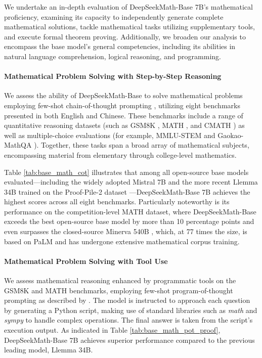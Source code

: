 \begin{itemize}[topsep=0pt]
\begin{itemize}[topsep=0pt]
We undertake an in-depth evaluation of DeepSeekMath-Base 7B’s mathematical proficiency, examining its capacity to independently generate complete mathematical solutions, tackle mathematical tasks utilizing supplementary tools, and execute formal theorem proving. Additionally, we broaden our analysis to encompass the base model's general competencies, including its abilities in natural language comprehension, logical reasoning, and programming.

\paragraph{Mathematical Problem Solving with Step-by-Step Reasoning}

We assess the ability of DeepSeekMath-Base to solve mathematical problems employing few-shot chain-of-thought prompting \citep{cot}, utilizing eight benchmarks presented in both English and Chinese. These benchmarks include a range of quantitative reasoning datasets (such as GSM8K \citep{gsm8k}, MATH \citep{MATH}, and CMATH \citep{wei2023cmath}) as well as multiple-choice evaluations (for example, MMLU-STEM \citep{mmlu} and Gaokao-MathQA \citep{agieval}). Together, these tasks span a broad array of mathematical subjects, encompassing material from elementary through college-level mathematics.

Table \ref{tab:base_math_cot} illustrates that among all open-source base models evaluated—including the widely adopted Mistral 7B \citep{mistral} and the more recent Llemma 34B \citep{llemma} trained on the Proof-Pile-2 dataset \citep{llemma}—DeepSeekMath-Base 7B achieves the highest scores across all eight benchmarks. Particularly noteworthy is its performance on the competition-level MATH dataset, where DeepSeekMath-Base exceeds the best open-source base model by more than 10 percentage points and even surpasses the closed-source Minerva 540B \citep{minerva}, which, at 77 times the size, is based on PaLM \citep{palm} and has undergone extensive mathematical corpus training.

\paragraph{Mathematical Problem Solving with Tool Use} We assess mathematical reasoning enhanced by programmatic tools on the GSM8K and MATH benchmarks, employing few-shot program-of-thought prompting as described by \citet{pot,pal}. The model is instructed to approach each question by generating a Python script, making use of standard libraries such as \textit{math} and \textit{sympy} to handle complex operations. The final answer is taken from the script's execution output. As indicated in Table \ref{tab:base_math_pot_proof}, DeepSeekMath-Base 7B achieves superior performance compared to the previous leading model, Llemma 34B.


\end{itemize}
\end{itemize}
